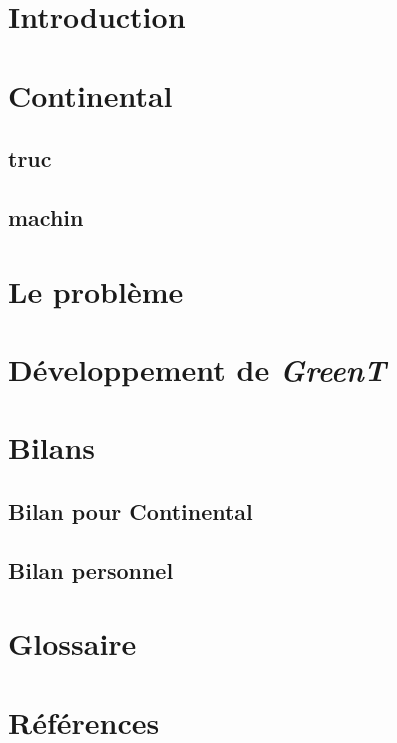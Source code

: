 \documentclass[12pt,a4paper]{book}
\begin{document}
	\setcounter{tocdepth}{1}
	\setcounter{secnumdepth}{3}
	\setcounter{minitocdepth}{1}
	
	~
	\newpage
	~
	\vfill
	\hfill
	\begin{minipage}{0.7\textwidth}
		\lipsum[4]
		\lipsum[4]
	\end{minipage}
	\vfill
	~
	\chapter*{Introduction}
	\lipsum
	\tableofcontents
	\chapter{Continental}
	\section{truc}
	\lipsum
	\section{machin}
	\lipsum
	\chapter{Le problème}
	\lipsum
	\chapter{Développement de \textit{GreenT}}
	\lipsum
	\chapter{Bilans}
	\lipsum[3]
	\section{Bilan pour Continental}
	\lipsum
	\section{Bilan personnel}
	\lipsum
	\appendix
	\chapter{Glossaire}
	\chapter{Références}
	\listoffigures
\end{document}

